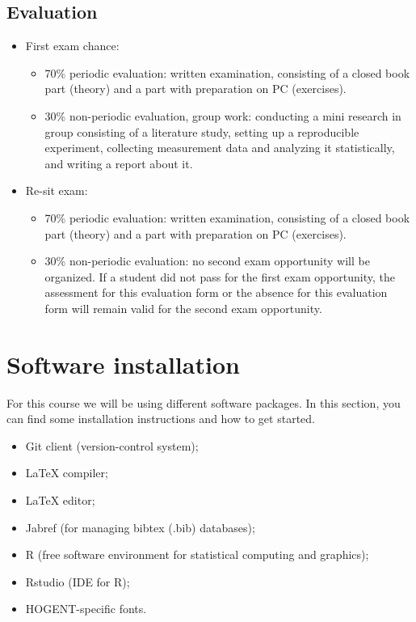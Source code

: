 \subsection{Evaluation}

\begin{itemize}
    \item First exam chance:
    \begin{itemize}
        \item 70\% periodic evaluation: written examination, consisting of a closed book part (theory) and a part with preparation on PC (exercises).
        \item 30\% non-periodic evaluation, group work: conducting a mini research in group consisting of a literature study, setting up a reproducible experiment, collecting measurement data and analyzing it statistically, and writing a report about it.
    \end{itemize}
    \item Re-sit exam:
    \begin{itemize}
        \item 70\% periodic evaluation: written examination, consisting of a closed book part (theory) and a part with preparation on PC (exercises).
        \item 30\% non-periodic evaluation: no second exam opportunity will be organized. If a student did not pass for the first exam opportunity, the assessment for this evaluation form or the absence for this evaluation form will remain valid for the second exam opportunity.
    \end{itemize}
\end{itemize}

\section{Software installation}
\label{sec:installatie-software}

For this course we will be using different software packages. In this section, you can find some installation instructions and how to get started.

\begin{itemize}
    \item Git client (version-control system);
    \item \LaTeX{} compiler;
    \item \LaTeX{} editor;
    \item Jabref (for managing bibtex (.bib) databases);
    \item R (free software environment for statistical computing and graphics);
    \item Rstudio (IDE for R);
    \item HOGENT-specific fonts.
\end{itemize}

